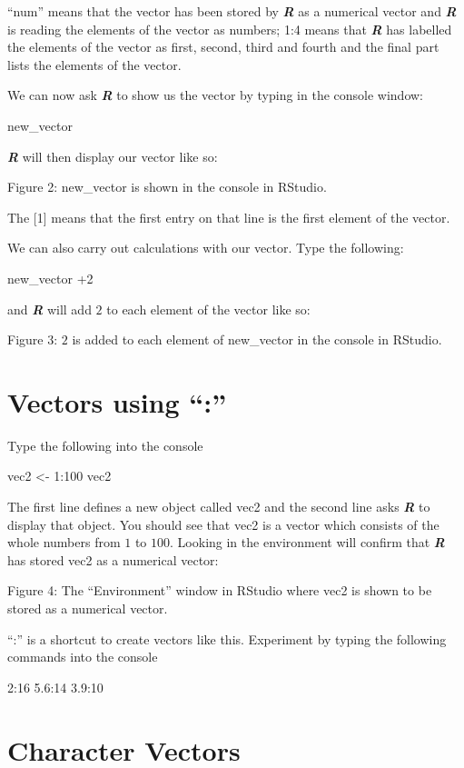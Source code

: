 \documentclass[
]{book}
\begin{document}
``num'' means that the vector has been stored by \textbf{\emph{R}} as a numerical vector and \textbf{\emph{R}} is reading the elements of the vector as numbers; 1:4 means that \textbf{\emph{R}} has labelled the elements of the vector as first, second, third and fourth and the final part lists the elements of the vector.

We can now ask \textbf{\emph{R}} to show us the vector by typing in the console window:

new\_vector

\textbf{\emph{R}} will then display our vector like so:

Figure 2: new\_vector is shown in the console in RStudio.

The {[}1{]} means that the first entry on that line is the first element of the vector.

We can also carry out calculations with our vector. Type the following:

new\_vector +2

and \textbf{\emph{R}} will add \(2\) to each element of the vector like so:

Figure 3: \(2\) is added to each element of new\_vector in the console in RStudio.

\section{Vectors using ``:''}\label{vectors-using}

Type the following into the console

vec2 \textless- 1:100
vec2

The first line defines a new object called vec2 and the second line asks \textbf{\emph{R}} to display that object. You should see that vec2 is a vector which consists of the whole numbers from \(1\) to \(100\). Looking in the environment will confirm that \textbf{\emph{R}} has stored vec2 as a numerical vector:

Figure 4: The ``Environment'' window in RStudio where vec2 is shown to be stored as a numerical vector.

``:'' is a shortcut to create vectors like this. Experiment by typing the following commands into the console

2:16
5.6:14
3.9:10

\section{Character Vectors}\label{character-vectors}
\end{document}
